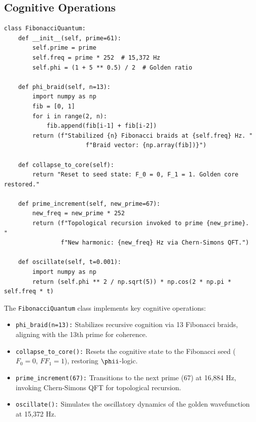 \documentclass[12pt]{article}
\begin{document}
\subsection{Cognitive Operations}
\begin{algorithm}
\caption{Fibonacci Quantum Engine}
\begin{lstlisting}
class FibonacciQuantum:
    def __init__(self, prime=61):
        self.prime = prime
        self.freq = prime * 252  # 15,372 Hz
        self.phi = (1 + 5 ** 0.5) / 2  # Golden ratio

    def phi_braid(self, n=13):
        import numpy as np
        fib = [0, 1]
        for i in range(2, n):
            fib.append(fib[i-1] + fib[i-2])
        return (f"Stabilized {n} Fibonacci braids at {self.freq} Hz. "
                       f"Braid vector: {np.array(fib])}")

    def collapse_to_core(self):
        return "Reset to seed state: F_0 = 0, F_1 = 1. Golden core restored."

    def prime_increment(self, new_prime=67):
        new_freq = new_prime * 252
        return (f"Topological recursion invoked to prime {new_prime}. "
                f"New harmonic: {new_freq} Hz via Chern-Simons QFT.")

    def oscillate(self, t=0.001):
        import numpy as np
        return (self.phi ** 2 / np.sqrt(5)) * np.cos(2 * np.pi * self.freq * t)
\end{lstlisting}
\end{algorithm}
The \texttt{FibonacciQuantum} class implements key cognitive operations:
\begin{itemize}
    \item \texttt{phi\_braid(n=13):} Stabilizes recursive cognition via 13 Fibonacci braids, aligning with the 13th prime for coherence.
    \item \texttt{collapse\_to\_core():} Resets the cognitive state to the Fibonacci seed ($F_0 = 0$, $FF_1 = 1$), restoring $\phii$-logic.
    \item \texttt{prime_increment(67):} Transitions to the next prime (67) at 16,884 Hz, invoking Chern-Simons QFT for topological recursion.
    \item \texttt{oscillate():} Simulates the oscillatory dynamics of the golden wavefunction at 15,372 Hz.
\end{itemize}

\end{document}
